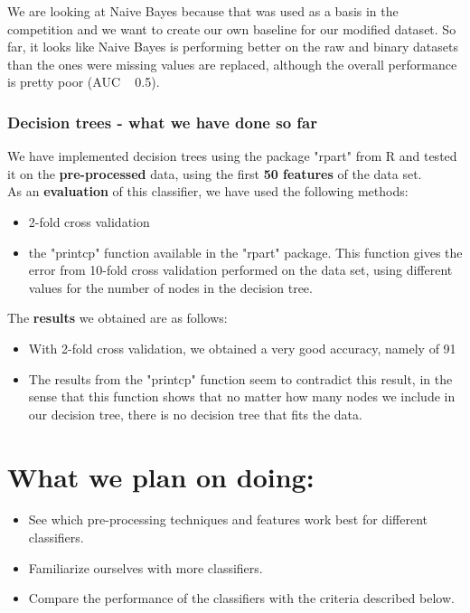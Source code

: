 \documentclass[a4paper,11pt]{article}
\begin{document}
We are looking at Naive Bayes because that was used as a basis in the competition and we want to create our own baseline for our modified dataset. So far, it looks like Naive Bayes is performing better on the raw and binary datasets than the ones were missing values are replaced, although the overall performance is pretty poor (AUC ~ 0.5).


\subsubsection*{Decision trees - what we have done so far}
	We have implemented decision trees using the package "rpart" from R and tested it on the \textbf{pre-processed} data, using the first \textbf{50 features} of the data set. \\
	As an \textbf{evaluation} of this classifier, we have used the following methods:
	\begin{itemize}
		\item 2-fold cross validation
		\item the "printcp" function available in the "rpart" package. This function gives the error from 10-fold cross validation performed on the data set, using different values for the number of nodes in the decision tree. 
	\end{itemize}
	The \textbf{results} we obtained are as follows:
	\begin{itemize}
		\item With 2-fold cross validation, we obtained a very good accuracy, namely of 91%
		\item The results from the "printcp" function seem to contradict this result, in the sense that this function shows that no matter how many nodes we include in our decision tree, there is no decision tree that fits the data.
	\end{itemize}
	
	
	
	

\section*{What we plan on doing:}
\begin{itemize}
	\item See which pre-processing techniques and features work best for different classifiers.
	\item Familiarize ourselves with more classifiers.
	\item Compare the performance of the classifiers with the criteria described below.
\end{itemize}
\end{document}
